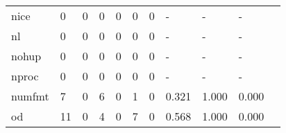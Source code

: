 \begin{longtable}{lp{1.2cm}p{1.2cm}p{1.2cm}p{1.2cm}p{1.2cm}p{1.2cm}p{1.2cm}p{1.2cm}p{1.2cm}p{1.2cm}}
nice      &                                     0 &                                                  0 &                                                0 &                                               0 &                                                0 &                                              0 &                                                  - &                                                  - &                                                  - \\
nl        &                                     0 &                                                  0 &                                                0 &                                               0 &                                                0 &                                              0 &                                                  - &                                                  - &                                                  - \\
nohup     &                                     0 &                                                  0 &                                                0 &                                               0 &                                                0 &                                              0 &                                                  - &                                                  - &                                                  - \\
nproc     &                                     0 &                                                  0 &                                                0 &                                               0 &                                                0 &                                              0 &                                                  - &                                                  - &                                                  - \\
numfmt    &                                     7 &                                                  0 &                                                6 &                                               0 &                                                1 &                                              0 &                                              0.321 &                                              1.000 &                                              0.000 \\
od        &                                    11 &                                                  0 &                                                4 &                                               0 &                                                7 &                                              0 &                                              0.568 &                                              1.000 &                                              0.000 \\

\end{longtable}
